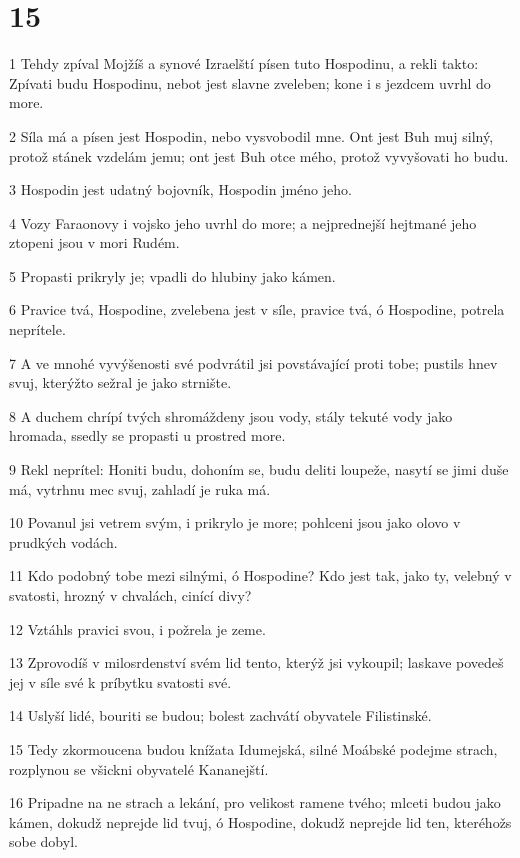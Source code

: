 \chapter{15}

\par 1 Tehdy zpíval Mojžíš a synové Izraelští písen tuto Hospodinu, a rekli takto: Zpívati budu Hospodinu, nebot jest slavne zveleben; kone i s jezdcem uvrhl do more.
\par 2 Síla má a písen jest Hospodin, nebo vysvobodil mne. Ont jest Buh muj silný, protož stánek vzdelám jemu; ont jest Buh otce mého, protož vyvyšovati ho budu.
\par 3 Hospodin jest udatný bojovník, Hospodin jméno jeho.
\par 4 Vozy Faraonovy i vojsko jeho uvrhl do more; a nejprednejší hejtmané jeho ztopeni jsou v mori Rudém.
\par 5 Propasti prikryly je; vpadli do hlubiny jako kámen.
\par 6 Pravice tvá, Hospodine, zvelebena jest v síle, pravice tvá, ó Hospodine, potrela neprítele.
\par 7 A ve mnohé vyvýšenosti své podvrátil jsi povstávající proti tobe; pustils hnev svuj, kterýžto sežral je jako strnište.
\par 8 A duchem chrípí tvých shromáždeny jsou vody, stály tekuté vody jako hromada, ssedly se propasti u prostred more.
\par 9 Rekl neprítel: Honiti budu, dohoním se, budu deliti loupeže, nasytí se jimi duše má, vytrhnu mec svuj, zahladí je ruka má.
\par 10 Povanul jsi vetrem svým, i prikrylo je more; pohlceni jsou jako olovo v prudkých vodách.
\par 11 Kdo podobný tobe mezi silnými, ó Hospodine? Kdo jest tak, jako ty, velebný v svatosti, hrozný v chvalách, cinící divy?
\par 12 Vztáhls pravici svou, i požrela je zeme.
\par 13 Zprovodíš v milosrdenství svém lid tento, kterýž jsi vykoupil; laskave povedeš jej v síle své k príbytku svatosti své.
\par 14 Uslyší lidé, bouriti se budou; bolest zachvátí obyvatele Filistinské.
\par 15 Tedy zkormoucena budou knížata Idumejská, silné Moábské podejme strach, rozplynou se všickni obyvatelé Kananejští.
\par 16 Pripadne na ne strach a lekání, pro velikost ramene tvého; mlceti budou jako kámen, dokudž neprejde lid tvuj, ó Hospodine, dokudž neprejde lid ten, kteréhožs sobe dobyl.
